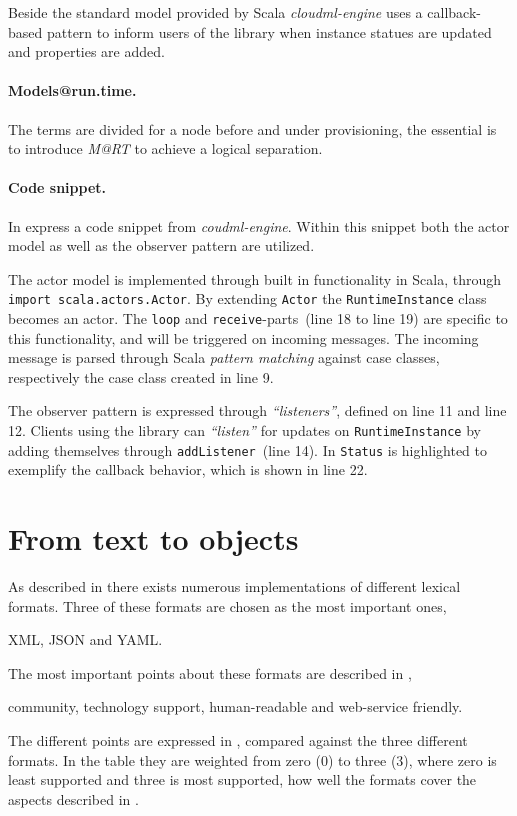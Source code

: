 Beside the standard model provided by Scala \emph{cloudml-engine} uses
a callback-based pattern to inform users of the library when instance statues
are updated and properties are added.

\paragraph{Models@run.time.}

The terms are divided for a node before and under provisioning, the essential is to introduce 
\emph{M@RT} to achieve a logical separation.

\paragraph{Code snippet.}


In  express a code snippet from \emph{coudml-engine}.
Within this snippet both the actor model as well as the observer pattern are utilized.

The actor model is implemented through built in functionality in Scala,
through \texttt{import scala.actors.Actor}.
By extending \texttt{Actor} the \texttt{RuntimeInstance} class becomes an actor.
The \texttt{loop} and \texttt{receive}-parts~(line 18 to line 19) are specific to this functionality,
and will be triggered on incoming messages.
The incoming message is parsed through Scala \emph{pattern matching} against case classes,
respectively the case class created in line 9.

The observer pattern is expressed through \emph{``listeners''}, defined on line 11 and line 12.
Clients using the library can \emph{``listen''} for updates on \texttt{RuntimeInstance}
by adding themselves through \texttt{addListener}~(line 14).
In  \texttt{Status} is highlighted to exemplify 
the callback behavior, which is shown in line 22.

\section{From text to objects}


As described in  there exists numerous implementations of different lexical formats.
Three of these formats are chosen as the most important ones,
\begin{ii}
  \iitem XML,
  \iitem JSON and
  \iitem YAML.
\end{ii}
The most important points about these formats are described in ,
\ie
\begin{ii}
  \iitem community,
  \iitem technology support,
  \iitem human-readable and
  \iitem web-service friendly.
\end{ii}
The different points are expressed in , 
compared against the three different formats.
In the table they are weighted from zero ($0$) to three ($3$),
where zero is least supported and three is most supported,
\ie how well the formats cover the aspects described in .


